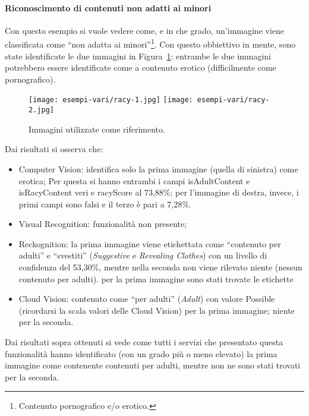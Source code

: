 \paragraph{Riconoscimento di contenuti non adatti ai minori}\label{par:riconscimento-racy}
Con questo esempio si vuole vedere come, e in che grado, un'immagine viene classificata come ``non adatta ai minori''\footnote{Contenuto pornografico e/o erotico.}.
Con questo obbiettivo in mente, sono state identificate le due immagini in Figura~\ref{fig:riconscimento-racy}: entrambe le due immagini potrebbero essere identificate
come a contenuto erotico (difficilmente come pornografico).
\begin{figure}[!h]
\begin{center}
	\texttt{[image: esempi-vari/racy-1.jpg]}
	\hfill
	\texttt{[image: esempi-vari/racy-2.jpg]}
{\scriptsize \caption{Immagini utilizzate come riferimento.}
\label{fig:riconscimento-racy}}
\end{center}
\end{figure}
%
Dai risultati si osserva che:
\begin{itemize}
	\item Computer Vision: identifica solo la prima immagine (quella di sinistra) come erotica;
		Per questa si hanno entrambi i campi \textsf{isAdultContent} e \textsf{isRacyContent} veri e
		\textsf{racyScore} al 73,88\%; per l'immagine di destra, invece, i primi campi sono falsi
		e il terzo è pari a 7,28\%.
	\item Visual Recognition: funzionalità non presente;
	\item Reckognition: la prima immagine viene etichettata come ``contenuto per adulti'' e ``svestiti'' (\textit{Suggestive} e \textit{Revealing Clothes}) con un
	livello di confidenza del 53,30\%, mentre nella seconda non viene rilevato niente (nessun contenuto per adulti).
	per la prima immagine sono stati trovate le etichette
	\item Cloud Vision: contenuto come ``per adulti'' (\textit{Adult}) con valore \textsf{Possible} (ricordarsi la scala valori delle Cloud Vision) per la prima immagine;
	niente per la seconda.
\end{itemize}
Dai risultati sopra ottenuti si vede come tutti i servizi che presentato questa funzionalità hanno identificato (con un grado più o meno elevato)
la prima immagine come contenente contenuti per adulti, mentre non ne sono stati trovati per la seconda.
%
